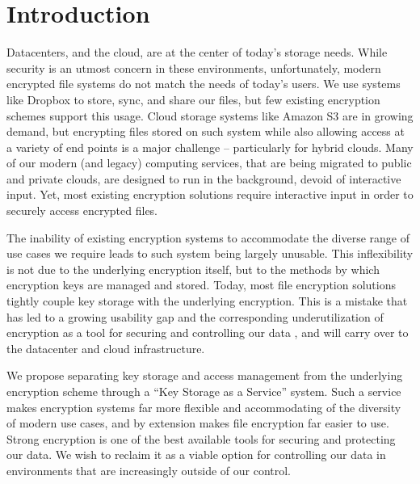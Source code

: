 \section{Introduction}
\label{sec:intro}

Datacenters, and the cloud, are at the center of today's storage needs.
While security is an utmost concern in these environments,
unfortunately, modern encrypted file systems do not match the needs
of today's users.  
We use systems like Dropbox to store, sync, and
share our files, but few existing encryption schemes support this
usage. Cloud storage systems like Amazon S3 are in
growing demand, but encrypting files stored on such system while also
allowing access at a variety of end points is a major challenge -- 
particularly for hybrid clouds.
Many of our modern (and legacy) computing services, that are being migrated
to public and private clouds, are designed to run in
the background, devoid of interactive input.  Yet, most existing
encryption solutions require interactive input in order to securely
access encrypted files. 

The inability of existing encryption systems
to accommodate the diverse range of use cases we require leads to such
system being largely unusable. This inflexibility is not due to the
underlying encryption itself, but to the methods by which encryption
keys are managed and stored. Today, most file encryption solutions
tightly couple key storage with the underlying encryption. This is a
mistake that has led to a growing usability gap and the corresponding
underutilization of encryption as a tool for securing and controlling
our data \cite{Whitten1999, Sweikata2009, Kher2005, Geambasu2011}, and
will carry over to the datacenter and cloud infrastructure.

We propose separating key storage and access management from the
underlying encryption scheme through a ``Key Storage as a Service''
system. Such a service makes encryption systems far more flexible and
accommodating of the diversity of modern use cases, and by extension
makes file encryption far easier to use. Strong encryption is one of
the best available tools for securing and protecting our data. We wish
to reclaim it as a viable option for controlling our data in
environments that are increasingly outside of our control.


